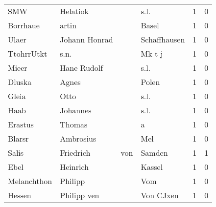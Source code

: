 \begin{tabular}{llllrr}
                      SMW &                           Helatiok &             &                                        s.l. &          1 &         0 \\
                 Borrhaue &                              artin &             &                                       Basel &          1 &         0 \\
                    Ulaer &                      Johann Honrad &             &                                Schaffhausen &          1 &         0 \\
               TtohrrUtkt &                               s.n. &             &                                      Mk t j &          1 &         0 \\
                    Mieer &                        Hane Rudolf &             &                                        s.l. &          1 &         0 \\
                   Dluska &                              Agnes &             &                                       Polen &          1 &         0 \\
                    Gleia &                               Otto &             &                                        s.l. &          1 &         0 \\
                     Haab &                           Johannes &             &                                        s.l. &          1 &         0 \\
                  Erastus &                             Thomas &             &                                           a &          1 &         0 \\
                   Blarsr &                          Ambrosius &             &                                         Mel &          1 &         0 \\
                    Salis &                          Friedrich &         von &                                      Samden &          1 &         1 \\
                     Ebel &                           Heinrich &             &                                      Kassel &          1 &         0 \\
              Melanchthon &                            Philipp &             &                                         Vom &          1 &         0 \\
                   Hessen &                        Philipp ven &             &                                   Von CJxen &          1 &         0 \\

\end{tabular}
